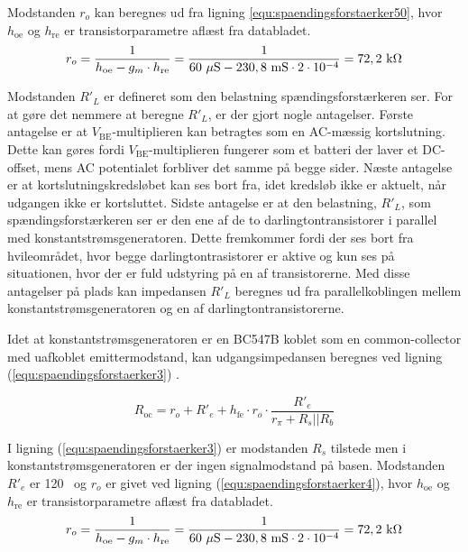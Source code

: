 Modstanden $r_o$ kan beregnes ud fra ligning \ref{equ:spaendingsforstaerker50},  hvor $h_{\mathrm{oe}}$ og $h_{\mathrm{re}}$ er transistorparametre aflæst fra databladet.
\begin{equation}
\label{equ:spaendingsforstaerker50}
r_o = \frac{1}{h_{\mathrm{oe}} - g_m \cdot h_{\mathrm{re}}} = \frac{1}{60~\mathrm{\mu S} - 230,8~\mathrm{mS} \cdot 2 \cdot 10^{-4}} = 72,2~\mathrm{k}\ohm
\end{equation}

Modstanden $R'_L$ er defineret som den belastning spændingsforstærkeren ser. For at gøre det nemmere at beregne $R'_L$, er der gjort nogle antagelser. Første antagelse er at $V_\mathrm{BE}$-multiplieren kan betragtes som en AC-mæssig kortslutning. Dette kan gøres fordi $V_\mathrm{BE}$-multiplieren fungerer som et batteri der laver et DC-offset, mens AC potentialet  forbliver det samme på begge sider. Næste antagelse er at kortslutningskredsløbet kan ses bort fra, idet kredsløb ikke er aktuelt, når udgangen ikke er kortsluttet. Sidste antagelse er at den belastning, $R'_L$, som spændingsforstærkeren ser er den ene af de to darlingtontransistorer i parallel med konstantstrømsgeneratoren. Dette fremkommer fordi der ses bort fra hvileområdet, hvor begge darlingtontrasistorer er aktive og kun ses på situationen, hvor der er fuld udstyring på en af transistorerne.
Med disse antagelser på plads kan impedansen $R'_L$ beregnes ud fra parallelkoblingen mellem konstantstrømsgeneratoren og en af darlingtontransistorerne.

Idet at konstantstrømsgeneratoren er en BC547B koblet som en common-collector med uafkoblet emittermodstand, kan udgangsimpedansen beregnes ved ligning (\ref{equ:spaendingsforstaerker3}) \cite{ael-mm7}.%

\begin{equation}
\label{equ:spaendingsforstaerker3}
R_{\mathrm{oc}} = r_o + R'_e + h_{\mathrm{fe}} \cdot r_o \cdot \frac{R'_e}{r_{\pi} + R_s || R_b}
\end{equation}

I ligning (\ref{equ:spaendingsforstaerker3}) er modstanden $R_s$ tilstede men i konstantstrømsgeneratoren er der ingen signalmodstand på basen. Modstanden $R'_e$ er 120 \ohm~og $r_o$ er givet ved ligning (\ref{equ:spaendingsforstaerker4}), hvor $h_{\mathrm{oe}}$ og $h_{\mathrm{re}}$ er transistorparametre aflæst fra databladet.
\begin{equation}
\label{equ:spaendingsforstaerker4}
r_o = \frac{1}{h_{\mathrm{oe}} - g_m \cdot h_{\mathrm{re}}} = \frac{1}{60~\mathrm{\mu S} - 230,8~\mathrm{mS} \cdot 2 \cdot 10^{-4}} = 72,2~\mathrm{k}\ohm
\end{equation}


